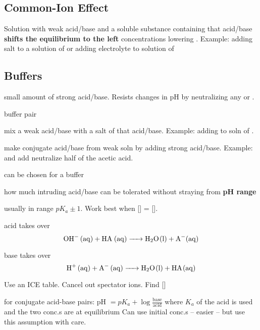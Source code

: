 \begin{mdframed}
\begin{multicols}{2}
\subsection{Common-Ion Effect}
Solution with weak acid/base and a soluble substance containing that acid/base
\textbf{shifts the equilibrium to the left}
concentrations lowering . Example: adding  salt to a
solution of  or adding  electrolyte to solution of

\subsection{Buffers}
\begin{compactdesc}
\item[Buffered soluton] small amount of strong acid/base. Resists changes in pH
    by neutralizing any  or .
\item[Composition example] buffer pair 
\item[Composition method 1] mix a weak acid/base with a salt of that acid/base.
    Example: adding  to soln of .
\item[Composition method 2] make conjugate acid/base from weak soln by adding strong
    acid/base. Example:  and add  neutralize half of the
    acetic acid.
\item[Any pH] can be chosen for a buffer
\item[Buffer capacity] how much intruding acid/base can be tolerated without
    straying from \textbf{pH range}
\item[pH Range] usually in range $pK_a \pm 1$.
    Work best when [] = [].
\item[Add \ce{OH^-} ions] acid takes over
    \[\ce{OH^- (aq) + HA (aq) -> H2O(l) + A^-(aq)}\]
\item[Add \ce{H+} ions] base takes over
    \[\ce{H+ (aq) + A^- (aq) -> H2O(l) + HA(aq)}\]
\item[pH of a Buffer]
    Use an ICE table. Cancel out spectator ions. Find []
\item[Henderson-Hasselbalch equation] for conjugate acid-base pairs:
    pH $= pK_a + \log\frac{\text{base}}{\text{acid}}$
    where $K_a$ of the acid is used and the two conc.s are at equilibrium
    Can use initial conc.s -- easier -- but use this assumption with care.

\end{compactdesc}
\end{multicols}
\end{mdframed}
